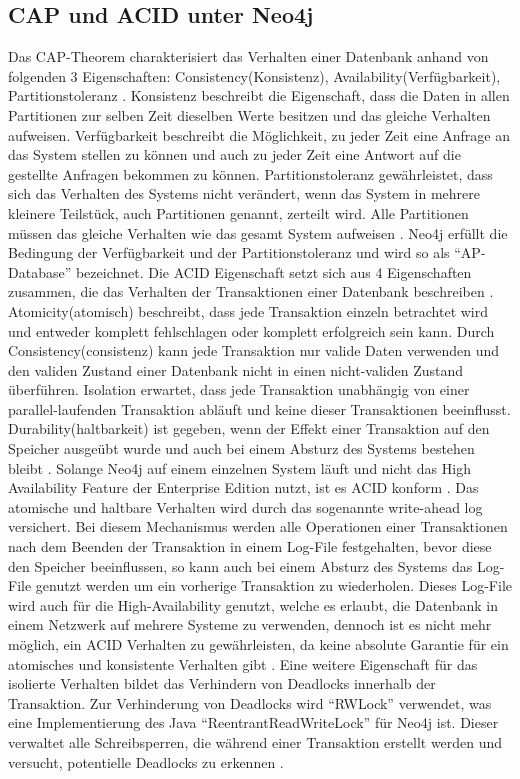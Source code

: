 \subsection{CAP und ACID unter Neo4j}
Das CAP-Theorem charakterisiert das Verhalten einer Datenbank anhand von folgenden 3 Eigenschaften: Consistency(Konsistenz), Availability(Verfügbarkeit), Partitionstoleranz \parencite{simon2000brewer}. Konsistenz beschreibt die Eigenschaft, dass die Daten in allen Partitionen zur selben Zeit dieselben Werte besitzen und das gleiche Verhalten aufweisen. Verfügbarkeit beschreibt die Möglichkeit, zu jeder Zeit eine Anfrage an das System stellen zu können und auch zu jeder Zeit eine Antwort auf die gestellte Anfragen bekommen zu können. Partitionstoleranz gewährleistet, dass sich das Verhalten des Systems nicht verändert, wenn das System in mehrere kleinere Teilstück, auch  Partitionen genannt, zerteilt wird. Alle Partitionen müssen das gleiche Verhalten wie das gesamt System aufweisen \parencite{simon2000brewer}. Neo4j erfüllt die Bedingung der Verfügbarkeit und der  Partitionstoleranz \parencite{vukotic2015neo4j} und wird so als “AP-Database” bezeichnet. \newline
Die ACID Eigenschaft setzt sich aus 4 Eigenschaften zusammen, die das Verhalten der Transaktionen einer  Datenbank beschreiben \parencite{haerder1983principles}. Atomicity(atomisch) beschreibt, dass jede Transaktion einzeln betrachtet wird und entweder komplett fehlschlagen oder komplett erfolgreich sein kann. Durch Consistency(consistenz) kann jede Transaktion nur valide Daten verwenden und den validen Zustand einer Datenbank nicht in einen nicht-validen Zustand überführen. Isolation erwartet, dass jede Transaktion unabhängig von einer parallel-laufenden Transaktion abläuft und keine dieser Transaktionen beeinflusst. Durability(haltbarkeit) ist gegeben, wenn der Effekt einer Transaktion auf den Speicher ausgeübt wurde und auch bei einem Absturz des Systems bestehen bleibt \parencite{haerder1983principles}. \newline Solange Neo4j auf einem einzelnen System läuft und nicht das High Availability Feature der Enterprise Edition nutzt, ist es ACID konform \parencite{holzschuher2013performance}. Das atomische und haltbare Verhalten wird durch das sogenannte write-ahead log versichert. Bei diesem Mechanismus  werden alle Operationen einer Transaktionen nach dem Beenden der Transaktion in einem Log-File  festgehalten, bevor diese  den Speicher beeinflussen, so kann auch bei einem Absturz des Systems das Log-File genutzt werden um ein vorherige Transaktion zu wiederholen.  Dieses Log-File wird auch für die High-Availability  genutzt, welche es erlaubt, die Datenbank in einem Netzwerk auf mehrere Systeme zu verwenden, dennoch ist es nicht mehr möglich, ein  ACID Verhalten zu gewährleisten, da keine absolute Garantie für ein  atomisches und konsistente Verhalten gibt \parencite{vukotic2015neo4j}. Eine weitere Eigenschaft für das isolierte Verhalten bildet das Verhindern von Deadlocks innerhalb der Transaktion. Zur Verhinderung von Deadlocks wird “RWLock” verwendet, was eine Implementierung des Java “ReentrantReadWriteLock” für Neo4j ist. Dieser verwaltet alle Schreibsperren, die während einer Transaktion erstellt werden und versucht, potentielle Deadlocks zu erkennen \parencite{raj2015neo4j}.
